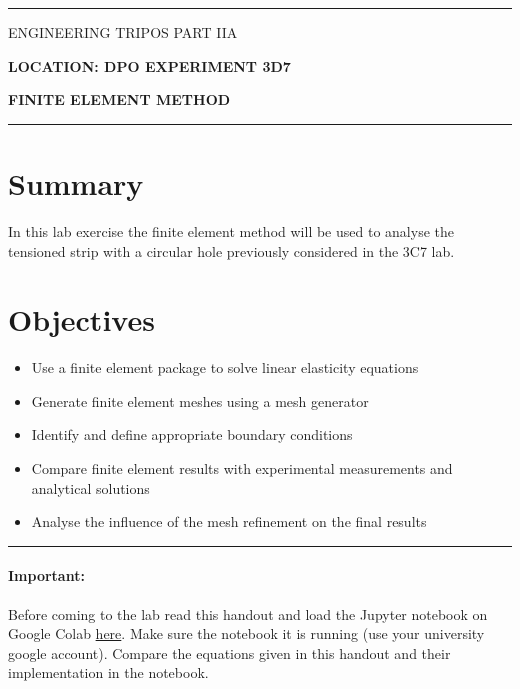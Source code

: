 \documentclass[11pt,a4paper]{article}
\begin{document}
\hrule\vspace{2mm} 
\centerline{\large   ENGINEERING TRIPOS PART IIA}
\vspace{0.5cm} \centerline{ \large \bfseries LOCATION: DPO  \hfill EXPERIMENT 3D7}
\vspace{0.5cm} \centerline{ \large \bfseries FINITE ELEMENT METHOD}
\vspace{2mm}
\hrule
%

%
\section*{Summary} 
%
In this lab exercise the finite element method will be used to analyse the tensioned strip with a circular hole previously considered in the 3C7 lab. 

%
\section*{Objectives} 
%
\begin{itemize}
\item Use a finite element package to solve linear elasticity equations

\item Generate finite element meshes using a mesh generator

\item Identify and define appropriate boundary conditions

\item Compare finite element results with experimental measurements and analytical solutions 

\item Analyse the influence of the mesh refinement on the final results
\end{itemize}

\vspace{0.5 cm} 
\hrule

\paragraph{Important:} Before coming to the lab read this handout and load the Jupyter notebook on Google Colab %
\href{https://colab.research.google.com/github/fcirak/3D7Lab/blob/main/notebook/3D7-lab-notebook-v2.ipynb}{here}. Make sure the notebook it is running (use your university google account). Compare the equations given in this handout and their implementation in the notebook.
\end{document}
